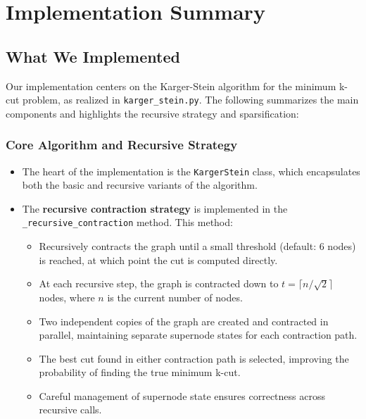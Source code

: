 \documentclass[11pt]{article}
\begin{document}
\section{Implementation Summary}

\subsection{What We Implemented}

Our implementation centers on the Karger-Stein algorithm for the minimum k-cut problem, as realized in \texttt{karger\_stein.py}. The following summarizes the main components and highlights the recursive strategy and sparsification:

\subsubsection{Core Algorithm and Recursive Strategy}
\begin{itemize}
    \item The heart of the implementation is the \texttt{KargerStein} class, which encapsulates both the basic and recursive variants of the algorithm.
    \item The \textbf{recursive contraction strategy} is implemented in the \texttt{\_recursive\_contraction} method. This method:
    \begin{itemize}
        \item Recursively contracts the graph until a small threshold (default: 6 nodes) is reached, at which point the cut is computed directly.
        \item At each recursive step, the graph is contracted down to \( t = \lceil n / \sqrt{2} \rceil \) nodes, where \( n \) is the current number of nodes.
        \item Two independent copies of the graph are created and contracted in parallel, maintaining separate supernode states for each contraction path.
        \item The best cut found in either contraction path is selected, improving the probability of finding the true minimum k-cut.
        \item Careful management of supernode state ensures correctness across recursive calls.
    \end{itemize}
\end{itemize}
\end{document}
